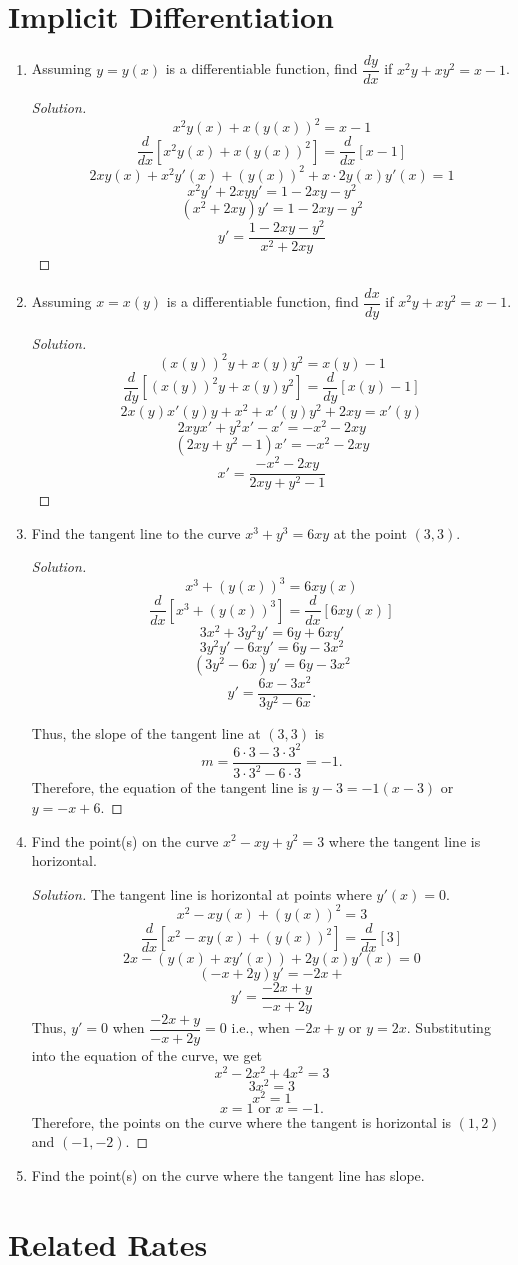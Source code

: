 \documentclass[12pt]{article}
\newenvironment{solution}{\begin{proof}[Solution]}{\end{proof}}
\begin{document}
	\section{Implicit Differentiation}
	\begin{enumerate}
	\item Assuming $y=y(x)$ is a differentiable function, find $\dfrac{dy}{dx}$ if $x^2y+xy^2=x-1$.
	\begin{solution}
		$$x^2y(x)+x(y(x))^2=x-1$$
		$$\dfrac{d}{dx}[x^2y(x)+x(y(x))^2]=\dfrac{d}{dx}[x-1]$$
		$$2xy(x)+x^2y'(x)+(y(x))^2+x\cdot 2y(x)y'(x)=1$$
		$$x^2y'+2xyy'=1-2xy-y^2$$
		$$(x^2+2xy)y'=1-2xy-y^2$$
		$$y'=\dfrac{1-2xy-y^2}{x^2+2xy}$$
	\end{solution}
	
	\item Assuming $x=x(y)$ is a differentiable function, find $\dfrac{dx}{dy}$ if $x^2y+xy^2=x-1$.
	\begin{solution}
		$$(x(y))^2y+x(y)y^2=x(y)-1$$
		$$\dfrac{d}{dy}[(x(y))^2y+x(y)y^2]=\dfrac{d}{dy}[x(y)-1]$$
		$$2x(y)x'(y)y+x^2+x'(y)y^2+2xy=x'(y)$$
		$$2xyx'+y^2x'-x'=-x^2-2xy$$
		$$(2xy+y^2-1)x'=-x^2-2xy$$
		$$x'=\dfrac{-x^2-2xy}{2xy+y^2-1}$$
		
	\end{solution}
	
	\item Find the tangent line to the curve $x^3+y^3=6xy$ at the point $(3,3)$.
	\begin{solution}
		$$x^3+(y(x))^3=6xy(x)$$
		$$\dfrac{d}{dx}[x^3+(y(x))^3]=\dfrac{d}{dx}[6xy(x)]$$
		$$3x^2+3y^2y'=6y+6xy'$$
		$$3y^2y'-6xy'=6y-3x^2$$
		$$(3y^2-6x)y'=6y-3x^2$$
		$$y'=\dfrac{6x-3x^2}{3y^2-6x}.$$
		
		Thus, the slope of the tangent line at $(3,3)$ is $$m=\dfrac{6\cdot 3-3\cdot 3^2}{3\cdot3^2-6\cdot 3}=-1.$$
		Therefore, the equation of the tangent line is $y-3=-1(x-3)$ or $y=-x+6$.
	\end{solution}
	
		\item Find the point(s) on the curve $x^2-xy+y^2=3$ where the tangent line is horizontal.
	\begin{solution}
		The tangent line is horizontal at points where $y'(x)=0$.
		$$x^2-xy(x)+(y(x))^2=3$$
		$$\dfrac{d}{dx}[x^2-xy(x)+(y(x))^2]=\dfrac{d}{dx}[3]$$
		$$2x-(y(x)+xy'(x))+2y(x)y'(x)=0$$
		$$(-x+2y)y'=-2x+$$
		$$y'=\dfrac{-2x+y}{-x+2y}$$
		Thus, $y'=0$ when $\dfrac{-2x+y}{-x+2y}=0$ i.e., when $-2x+y$ or $y=2x$. Substituting into the equation of the curve, we get $$x^2-2x^2+4x^2=3$$ $$3x^2=3$$ $$x^2=1$$ $$x=1\text{ or }x=-1.$$
		Therefore, the points on the curve where the tangent is horizontal is $(1,2)$ and $(-1,-2)$.
	\end{solution}
	
	\item Find the point(s) on the curve where the tangent line has slope.
\end{enumerate}

\section{Related Rates}
\end{document}
